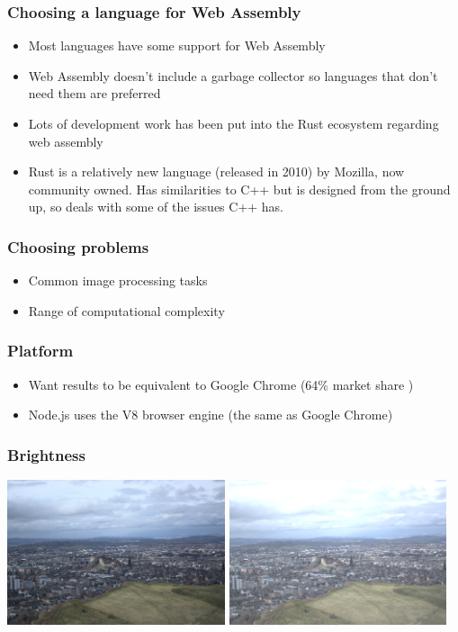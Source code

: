 \documentclass{beamer}
\begin{document}
\begin{frame}
    \frametitle{Choosing a language for Web Assembly}
    \begin{itemize}
        \item Most languages have some support for Web Assembly
        \item Web Assembly doesn't include a garbage collector so languages that don't need them are preferred
        \item Lots of development work has been put into the Rust ecosystem regarding web assembly
        \item Rust is a relatively new language (released in 2010) by Mozilla, now community owned. Has similarities to C++ but is designed from the ground up, so deals with some of the issues C++ has.
    \end{itemize}


\end{frame}

\begin{frame}
    \frametitle{Choosing problems}
    \begin{itemize}
        \item Common image processing tasks
        \item Range of computational complexity
    \end{itemize}
\end{frame}

\begin{frame}
    \frametitle{Platform}
    \begin{itemize}
        \item Want results to be equivalent to Google Chrome (64\% market share \cite{webmarketshare})
        \item Node.js uses the V8 browser engine (the same as Google Chrome)
    \end{itemize}
\end{frame}

\begin{frame}
    \frametitle{Brightness}
    \begin{center}
        \includegraphics[width=0.48\textwidth]{default.png}
        \includegraphics[width=0.48\textwidth]{bright.png}
    \end{center}

\end{frame}
\end{document}
